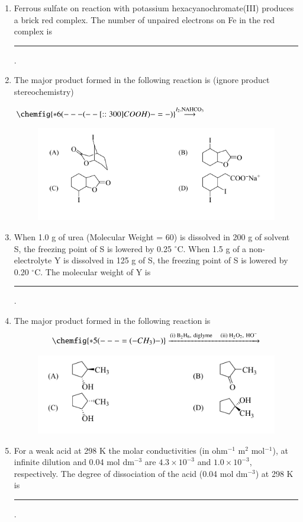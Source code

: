 \documentclass[journal,12pt,onecolumn]{IEEEtran}
\begin{document}
\begin{enumerate}[label=\arabic*.]
\item Ferrous sulfate on reaction with potassium hexacyanochromate(III) produces a brick red complex. The number of unpaired electrons on Fe in the red complex is \rule{2.5cm}{0.1pt}.

\item The major product formed in the following reaction is (ignore product stereochemistry)

\({\chemfig{*6(---(--[::300]COOH)-=-)}} 
{\overset{\text{$I_2$,NAHCO$_3$}}{\longrightarrow}} 
\)

\begin{figure}[H]
    \centering
    \includegraphics[width=0.9\columnwidth]{FIG/H-11.png}
    \caption*{}
    \label{fig:H-11}
\end{figure}

\item When 1.0 g of urea (Molecular Weight = 60) is dissolved in 200 g of solvent S, the freezing point of S is lowered by 0.25 $^\circ$C. When 1.5 g of a non-electrolyte Y is dissolved in 125 g of S, the freezing point of S is lowered by 0.20 $^\circ$C. The molecular weight of Y is \rule{2.5cm}{0.1pt}.

\item The major product formed in the following reaction is\\
\[
{\chemfig{*5(---=(-CH_3)-)}}
\xrightarrow{\text{(i) B}_2\text{H}_6,\ \text{diglyme}\hspace{1em} \text{(ii) H}_2\text{O}_2,\ \text{HO}^-}
\]
\begin{figure}[H]
    \centering
    \includegraphics[width=0.9\columnwidth]{FIG/H-13.png}
    \caption*{}
    \label{fig:H-13}
\end{figure}
\item For a weak acid at 298 K the molar conductivities (in ohm$^{-1}$ m$^2$ mol$^{-1}$), at infinite dilution and 0.04 mol dm$^{-3}$ are $4.3 \times 10^{-3}$ and $1.0 \times 10^{-3}$, respectively. The degree of dissociation of the acid (0.04 mol dm$^{-3}$) at 298 K is \rule{2.5cm}{0.1pt}.


\end{enumerate}
\end{document}
